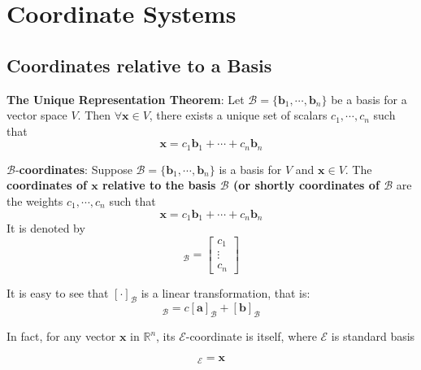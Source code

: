 \section{Coordinate Systems}
\subsection{Coordinates relative to a Basis}
\begin{Thm}
    \textbf{The Unique Representation Theorem}:
    Let $\mathcal{B} = \{\mathbf{b}_1, \cdots, \mathbf{b}_n \}$ be a basis for a vector space $V$. Then $\forall \mathbf{x}\in V$, there exists a unique set of scalars $c_1,\cdots, c_n$ such that
    \begin{equation*}
        \mathbf{x} = c_1\mathbf{b}_1 + \cdots  + c_n\mathbf{b}_n
    \end{equation*}
\end{Thm}
\begin{Def}
    $\mathcal{B}$-\textbf{coordinates}:
    Suppose $\mathcal{B} = \{\mathbf{b}_1, \cdots, \mathbf{b}_n \}$ is a basis for $V$ and $\mathbf{x}\in V$. The \textbf{coordinates of $\mathbf{x}$ relative to the basis $\mathcal{B}$ (or shortly coordinates of $\mathcal{B}$} are the weights $c_1,\cdots, c_n$ such that
    \begin{equation*}
        \mathbf{x} = c_1\mathbf{b}_1 + \cdots  + c_n\mathbf{b}_n
    \end{equation*}
    It is denoted by
    \begin{equation*}
        [\mathbf{x}]_{\mathcal{B}} = \begin{bmatrix}
            c_1\\
            \vdots\\
            c_n
        \end{bmatrix}
    \end{equation*}
    \begin{Rem}
        It is easy to see that $[\cdot]_{\mathcal{B}}$ is a linear transformation, that is:
        \begin{equation*}
            [c\mathbf{a} + \mathbf{b}]_\mathcal{B} = c[\mathbf{a}]_\mathcal{B} + [ \mathbf{b}]_\mathcal{B}
        \end{equation*}

        \noindent In fact, for any vector $\mathbf{x}$ in $\mathbb{R}^n$, its $\mathcal{E}$-coordinate is itself, where $\mathcal{E}$ is standard basis
    \end{Rem}
    

    \begin{equation*}
        [\mathbf{x}]_{\mathcal{E}} = \mathbf{x}
    \end{equation*}
    \end{Def}
    
